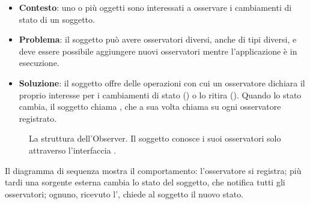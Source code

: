 \begin{itemize}
  \item \textbf{Contesto}: uno o più oggetti sono interessati a osservare i cambiamenti di stato di un soggetto.
  \item \textbf{Problema}: il soggetto può avere osservatori diversi, anche di tipi diversi, e deve essere possibile
        aggiungere nuovi osservatori mentre l'applicazione è in esecuzione.
  \item \textbf{Soluzione}: il soggetto offre delle operazioni con cui un osservatore dichiara il proprio interesse per i
        cambiamenti di stato () o lo ritira (). Quando lo stato cambia, il soggetto chiama
        , che a sua volta chiama  su ogni osservatore registrato.
\end{itemize}

\begin{figure}[H]
\centering
{}
\caption{La struttura dell'Observer. Il soggetto conosce i suoi osservatori solo attraverso l'interfaccia .}
\end{figure}

Il diagramma di sequenza mostra il comportamento: l'osservatore si registra; più tardi una sorgente esterna cambia lo stato
del soggetto, che notifica tutti gli osservatori; ognuno, ricevuto l', chiede al soggetto il nuovo stato.

